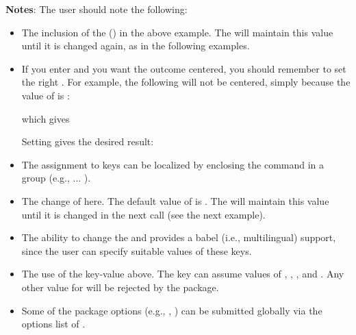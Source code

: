 \documentclass[a4paper,11pt,final]{article}
\def\ie{i.e.\xspace}
\def\eg{e.g.\xspace}
\def\ie{i.e.\xspace}
\begin{document}
\textbf{Notes}: The user should note the following:
\begin{itemize}
\item The inclusion of the  () in the above example. The  will maintain this value until it is changed again, as in the following examples.

\item If you enter  and you want the outcome centered, you should remember to set the right . For example, the following will not be centered, simply because the value of  is :

    \begin{gfdverbatim}
    \end{gfdverbatim}

    which gives


    Setting  gives the desired result:


\item The assignment to keys can be localized by enclosing the \cmda{\getfiledate} command in a group (\eg, \cmdb{\bgroup} ... \cmdb{\egroup}).

\item The change of  here. The default value of  is . The  will maintain this value until it is changed in the next call (see the next example).
\item The ability to change the  and  provides a babel (\ie, multilingual) support, since the user can specify suitable values of these keys.

\item The use of the key-value  above. The key  can assume values of , , , and . Any other value for  will be rejected by the package.
\item Some of the package options (\eg, , ) can be submitted globally via the options list of \cmdb{\documentclass}.
\end{itemize}
\end{document}

